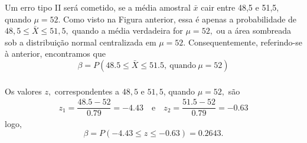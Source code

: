 \documentclass[14pt,aspectratio=1610]{beamer}
\newcommand{\bx}{\ensuremath{\bar{x}}}
\begin{document}
\begin{frame}{}
\frametitle{}
\begin{block}{}
\justifying
Um erro tipo II será cometido, se a média amostral $\bx$ cair entre 48,5 e 51,5, quando $\mu = 52.$ Como visto na Figura anterior, essa é apenas a probabilidade de 
$48,5 \leq \bar{X} \leq 51,5,$ quando a média verdadeira for $\mu = 52,$ ou a área sombreada sob a distribuição normal centralizada em $\mu = 52.$ Consequentemente, 
referindo-se à anterior, encontramos que $$\beta=P(48.5\leq\bar{X}\leq 51.5,\ \textrm{quando}\ \mu=52)$$
\end{block}
\end{frame}


\begin{frame}{}
\frametitle{}
\begin{block}{}
Os valores $z,$ correspondentes a $48,5$ e $51,5$, quando $\mu = 52,$ são
\begin{align*}
z_{1}=\dfrac{48.5-52}{0.79}=-4.43\quad \textrm{e}\quad z_{2}=\dfrac{51.5-52}{0.79}=-0.63
\end{align*}
logo, $$\beta=P(-4.43\leq z\leq -0.63)=0.2643.$$
\end{block}
\end{frame}
\end{document}

